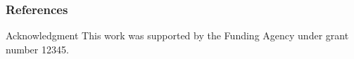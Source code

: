 \documentclass[aspectratio=169,xcolor=svgnames]{beamer}
\begin{document}
\section*{} %
\begin{frame}[allowframebreaks]\frametitle{References}
    
    
\end{frame}

\begin{frame}{Acknowledgment}
    This work was supported by the Funding Agency under grant number 12345.
\end{frame}
\end{document}

